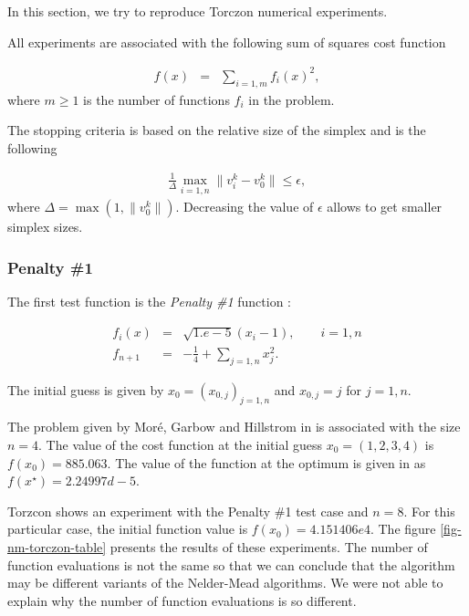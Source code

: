 In this section, we try to reproduce Torczon numerical experiments.

All experiments are associated with the following sum of squares cost function 

\begin{eqnarray}
\label{torzcon-sumofsquares}
f(x) &=& \sum_{i=1,m} f_i(x)^2,
\end{eqnarray}
where $m\geq 1$ is the number of functions $f_i$ in the problem.

The stopping criteria is based on the relative size of the 
simplex and is the following 

\begin{eqnarray}
\label{torzcon-stopping}
\frac{1}{\Delta} \max_{i=1,n} \|v_i^k - v_0^k\| \leq \epsilon,
\end{eqnarray}
where $\Delta = \max( 1 , \|v_0^k\| )$. Decreasing the value of 
$\epsilon$ allows to get smaller simplex sizes.

\subsubsection{Penalty \#1}
The first test function is the \emph{Penalty \#1} function :

\begin{eqnarray}
\label{torzcon-sumofsquares-case1}
f_i(x) &=& \sqrt{1.e-5}(x_i - 1), \qquad i=1,n\\
f_{n+1} & = & -\frac{1}{4} + \sum_{j=1,n} x_j^2.
\end{eqnarray}

The initial guess is given by $x_0 = (x_{0,j})_{j=1,n}$ and 
$x_{0,j} = j$ for $j=1,n$. 

The problem given by 
Moré, Garbow and Hillstrom in \cite{355943} is associated with 
the size $n=4$. The value of the cost function at the initial guess 
$x_0 = (1,2,3,4)$ is $f(x_0) = 885.063$. The value of the function
at the optimum is given in \cite{355943} as $f(x^\star) = 2.24997d-5$.

Torzcon shows an experiment with the Penalty \#1 test case and $n=8$.
For this particular case, the initial function value is $f(x_0) = 4.151406e4$.
The figure \ref{fig-nm-torczon-table} presents the results of these
experiments. The number of function evaluations is not the same
so that we can conclude that the algorithm may be different 
variants of the Nelder-Mead algorithms. We were not able to 
explain why the number of function evaluations is so different.

